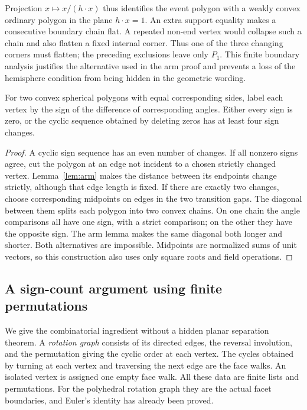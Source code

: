 Projection $x\mapsto x/(h\cdot x)$ thus identifies the event polygon
with a weakly convex ordinary polygon in the plane $h\cdot x=1$.
An extra support equality makes a consecutive boundary chain flat.
A repeated non-end vertex would collapse such a chain and also
flatten a fixed internal corner. Thus one of the three changing
corners must flatten; the preceding exclusions leave only $P_1$.
This finite boundary analysis justifies the alternative used in the
arm proof and prevents a loss of the hemisphere condition from being
hidden in the geometric wording.

\begin{lemma}\label{lem:four}
For two convex spherical polygons with equal corresponding sides,
label each vertex by the sign of the difference of corresponding
angles. Either every sign is zero, or the cyclic sequence obtained
by deleting zeros has at least four sign changes.
\end{lemma}
\begin{proof}
A cyclic sign sequence has an even number of changes. If all nonzero
signs agree, cut the polygon at an edge not incident to a chosen
strictly changed vertex. Lemma~\ref{lem:arm} makes the distance
between its endpoints change strictly, although that edge length
is fixed. If there are exactly two changes, choose corresponding
midpoints on edges in the two transition gaps. The diagonal between
them splits each polygon into two convex chains. On one chain the
angle comparisons all have one sign, with a strict comparison; on
the other they have the opposite sign. The arm lemma makes the
same diagonal both longer and shorter. Both alternatives are
impossible. Midpoints are normalized sums of unit vectors, so this
construction also uses only square roots and field operations.
\end{proof}

\subsection{A sign-count argument using finite permutations}

We give the combinatorial ingredient without a hidden planar
separation theorem. A \emph{rotation graph} consists of its directed
edges, the reversal involution, and the permutation giving the cyclic
order at each vertex. The cycles obtained by turning at each vertex
and traversing the next edge are the face walks. An isolated vertex
is assigned one empty face walk. All these data are finite lists and
permutations. For the polyhedral rotation graph they are the actual
facet boundaries, and Euler's identity has already been proved.


